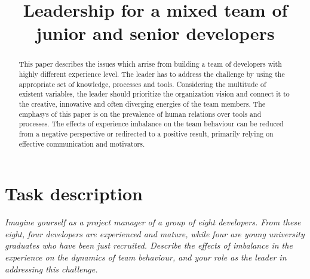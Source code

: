 \documentclass[conference]{IEEEtran}
\begin{document}
%
\title{Leadership for a mixed team  of \newline junior and senior developers}


\author{
}

\maketitle

\begin{abstract}
This paper describes the issues which arrise from building a team of developers
with highly different experience level. The leader has to address the challenge by using the appropriate 
set of knowledge, processes and tools. 
\newline
Considering the multitude of existent variables, the leader should prioritize the organization vision and connect it to the creative, innovative and often diverging energies of the team members. The emphasys of this paper is on the prevalence of human relations over tools and processes. The effects of experience imbalance on the team behaviour can be reduced from a negative perspective or redirected to a positive result, primarily relying on effective communication and motivators. 
\end{abstract}

\IEEEpeerreviewmaketitle

\section{Task description}
\textit{Imagine yourself as a project manager of a group of eight developers.
From these eight, four developers are experienced and mature, while four are young university graduates who have been just recruited. 
\newline\indent 
Describe the effects of imbalance in the experience on the dynamics of team behaviour, and your role as the leader in addressing this challenge.}
\end{document}
